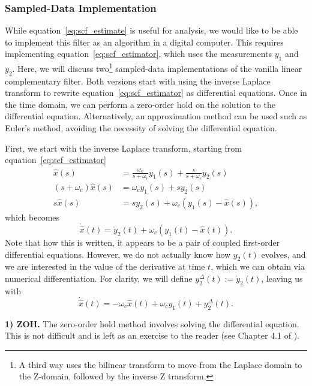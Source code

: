 \documentclass[a4paper]{article}
\begin{document}
\subsubsection*{Sampled-Data Implementation}
While equation~\eqref{eq:scf_estimate} is useful for analysis, we would like to be able to implement this filter as an algorithm in a digital computer.
This requires implementing equation~\eqref{eq:scf_estimator}, which uses the measurements $y_1$ and $y_2$.
Here, we will discuss two\footnote{A third way uses the bilinear transform to move from the Laplace domain to the Z-domain, followed by the inverse Z transform.} sampled-data implementations of the vanilla linear complementary filter.
Both versions start with using the inverse Laplace transform to rewrite equation~\eqref{eq:scf_estimator} as differential equations.
Once in the time domain, we can perform a zero-order hold on the solution to the differential equation.
Alternatively, an approximation method can be used such as Euler's method, avoiding the necessity of solving the differential equation.

First, we start with the inverse Laplace transform, starting from equation~\eqref{eq:scf_estimator}
\begin{align*}
            \hat{x}(s) &= \frac{\omega_c}{s+\omega_c}y_1(s) + \frac{s}{s+\omega_c}y_2(s) \\
(s+\omega_c)\hat{x}(s) &= \omega_c y_1(s) + s y_2(s) \\
           s\hat{x}(s) &= s y_2(s) + \omega_c \left(y_1(s) - \hat{x}(s)\right),
\end{align*}
which becomes
\begin{equation*}
\dot{\hat x}(t) = \dot{y}_2(t) + \omega_c\left(y_1(t) - \hat{x}(t)\right).
\end{equation*}
Note that how this is written, it appears to be a pair of coupled first-order differential equations.
However, we do not actually know how $y_2(t)$ evolves, and we are interested in the value of the derivative at time $t$, which we can obtain via numerical differentiation.
For clarity, we will define $y_2^\Delta(t):=\dot{y}_2(t)$, leaving us with
\begin{equation}
\dot{\hat x}(t) = -\omega_c\hat{x}(t) + \omega_cy_1(t) + y_2^\Delta(t).
\end{equation}

\noindent\textbf{1) ZOH.} The zero-order hold method involves solving the differential equation.
This is not difficult and is left as an exercise to the reader (see Chapter 4.1 of \citet{Beard2017}).
\end{document}
